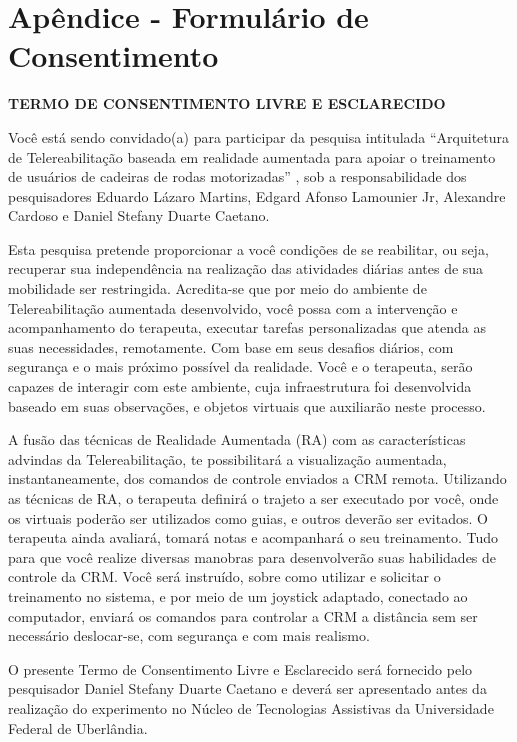 \chapter{Apêndice - Formulário de Consentimento}
\label{sec:consentFormPT}

\textbf{TERMO DE CONSENTIMENTO LIVRE E ESCLARECIDO}


\vspace{\baselineskip}
Você está sendo convidado(a) para participar da pesquisa intitulada ``Arquitetura de Telereabilitação baseada em realidade aumentada para apoiar o treinamento de usuários de cadeiras de rodas motorizadas'' , sob a responsabilidade dos pesquisadores Eduardo Lázaro Martins, Edgard Afonso Lamounier Jr, Alexandre Cardoso e Daniel Stefany Duarte Caetano.

Esta pesquisa pretende proporcionar a você condições de se reabilitar, ou seja, recuperar sua independência na realização das atividades diárias antes de sua mobilidade ser restringida. Acredita-se que por meio do ambiente de Telereabilitação aumentada desenvolvido, você possa com a intervenção e acompanhamento do terapeuta, executar tarefas personalizadas que atenda as suas necessidades, remotamente.  Com base em seus desafios diários, com segurança e o mais próximo possível da realidade.  Você e o terapeuta, serão capazes de interagir com este ambiente, cuja infraestrutura foi desenvolvida baseado em suas observações, e objetos virtuais que auxiliarão neste processo.

A fusão das técnicas de Realidade Aumentada (RA) com as características advindas da Telereabilitação, te possibilitará a visualização aumentada, instantaneamente, dos comandos de controle enviados a CRM remota.  Utilizando as técnicas de RA, o terapeuta definirá o trajeto a ser executado por você, onde os virtuais poderão ser utilizados como guias, e outros deverão ser evitados. O terapeuta ainda avaliará, tomará notas e acompanhará o seu treinamento. Tudo para que você realize diversas manobras para desenvolverão suas habilidades de controle da CRM.  Você será instruído, sobre como utilizar e solicitar o treinamento no sistema, e por meio de um joystick adaptado, conectado ao computador,  enviará os comandos para controlar a CRM a distância sem ser necessário deslocar-se, com segurança e com mais realismo.

O presente Termo de Consentimento Livre e Esclarecido será fornecido pelo pesquisador Daniel Stefany Duarte Caetano e deverá ser apresentado antes da realização do experimento no Núcleo de Tecnologias Assistivas da Universidade Federal de Uberlândia.

